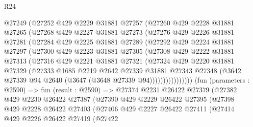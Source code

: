 \begin{lexlean}{R24}
\begin{coremodule}
            @27249
            (@27252
              @429
              @2229
              @31881
              @27257
              (@27260
                @429
                @2228
                @31881
                @27265
                (@27268
                  @429
                  @2227
                  @31881
                  @27273
                  (@27276
                    @429
                    @2226
                    @31881
                    @27281
                    (@27284
                      @429
                      @2225
                      @31881
                      @27289
                      (@27292
                        @429
                        @2224
                        @31881
                        @27297
                        (@27300
                          @429
                          @2223
                          @31881
                          @27305
                          (@27308
                            @429
                            @2222
                            @31881
                            @27313
                            (@27316
                              @429
                              @2221
                              @31881
                              @27321
                              (@27324
                                @429
                                @2220
                                @31881
                                @27329
                                (@27333
                                  @1685
                                  @2219
                                  @2642
                                  @27339
                                  @31881
                                  @27343
                                  @27348
                                  (@3642 @27339 @94 @2640 (@3647 (@3648 @27339 @94))))))))))))))))
        (fun (parameters : @2590) =>
        fun (result : @2590) =>
        @27374
          @2231
          @26422
          @27379
          (@27382
            @429
            @2230
            @26422
            @27387
            (@27390
              @429
              @2229
              @26422
              @27395
              (@27398
                @429
                @2228
                @26422
                @27403
                (@27406
                  @429
                  @2227
                  @26422
                  @27411
                  (@27414
                    @429
                    @2226
                    @26422
                    @27419
                    (@27422

\end{coremodule}
\end{lexlean}
